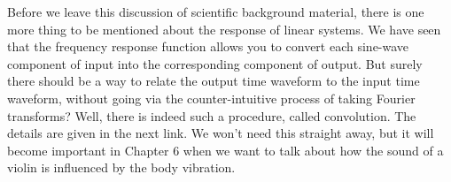 
  Before we leave this discussion of scientific background material, there is 
  one more thing to be mentioned about the response of linear systems. We have 
  seen that the frequency response function allows you to convert each 
  sine-wave component of input into the corresponding component of output. But 
  surely there should be a way to relate the output time waveform to the input 
  time waveform, without going via the counter-intuitive process of taking 
  Fourier transforms? Well, there is indeed such a procedure, called 
  convolution. The details are given in the next link. We won't need this 
  straight away, but it will become important in Chapter 6 when we want to talk 
  about how the sound of a violin is influenced by the body vibration. 

